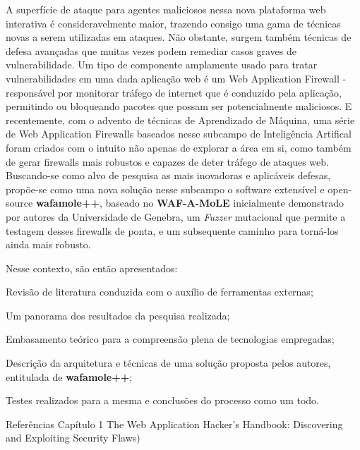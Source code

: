 A superfície de ataque para agentes maliciosos nessa nova plataforma web interativa é consideravelmente maior, trazendo consigo uma gama de técnicas novas a serem utilizadas em ataques. Não obstante, surgem também técnicas de defesa avançadas que muitas vezes podem remediar casos graves de vulnerabilidade. Um tipo de componente amplamente usado para tratar vulnerabilidades em uma dada aplicação web é um Web Application Firewall - responsável por monitorar tráfego de internet que é conduzido pela aplicação, permitindo ou bloqueando pacotes que possam ser potencialmente maliciosos. E recentemente, com o advento de técnicas de Aprendizado de Máquina, uma série de Web Application Firewalls baseados nesse subcampo de Inteligência Artifical foram criados com o intuito não apenas de explorar a área em si, como também de gerar firewalls mais robustos e capazes de deter tráfego de ataques web. Buscando-se como alvo de pesquisa as mais inovadoras e aplicáveis defesas, propõe-se como uma nova solução nesse subcampo o software extensível e open-source \textbf{wafamole++}, baseado no \textbf{WAF-A-MoLE} inicialmente demonstrado por autores da Universidade de Genebra, um \textit{Fuzzer} mutacional que permite a testagem desses firewalls de ponta, e um subsequente caminho para torná-los ainda mais robusto.

Nesse contexto, são então apresentados: 
\begin{alineas}
\item Revisão de literatura conduzida com o auxílio de ferramentas externas;
\item Um panorama dos resultados da pesquisa realizada;
\item Embasamento teórico para a compreensão plena de tecnologias empregadas;
\item Descrição da arquitetura e técnicas de uma solução proposta pelos autores, entitulada de \textbf{wafamole++};
\item Testes realizados para a mesma e conclusões do processo como um todo.
\end{alineas}




Referências Capítulo 1 The Web Application Hacker's Handbook: Discovering and Exploiting Security Flaws)

\bigskip
